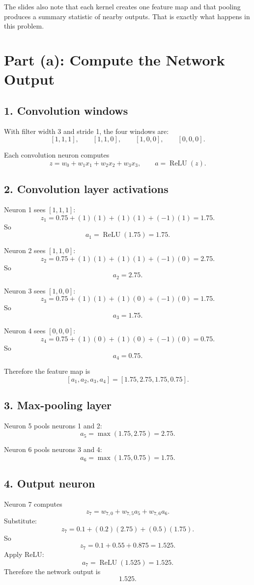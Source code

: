\documentclass[11pt]{article}
\begin{document}
The slides also note that each kernel creates one feature map and that pooling produces a summary statistic of nearby outputs. That is exactly what happens in this problem.

\section*{Part (a): Compute the Network Output}

\subsection*{1. Convolution windows}

With filter width 3 and stride 1, the four windows are:
\[
[1,1,1],\qquad [1,1,0],\qquad [1,0,0],\qquad [0,0,0].
\]

Each convolution neuron computes
\[
z=w_0+w_1x_1+w_2x_2+w_3x_3,
\qquad
a=\operatorname{ReLU}(z).
\]

\subsection*{2. Convolution layer activations}

Neuron 1 sees $[1,1,1]$:
\[
z_1=0.75+(1)(1)+(1)(1)+(-1)(1)=1.75.
\]
So
\[
a_1=\operatorname{ReLU}(1.75)=1.75.
\]

Neuron 2 sees $[1,1,0]$:
\[
z_2=0.75+(1)(1)+(1)(1)+(-1)(0)=2.75.
\]
So
\[
a_2=2.75.
\]

Neuron 3 sees $[1,0,0]$:
\[
z_3=0.75+(1)(1)+(1)(0)+(-1)(0)=1.75.
\]
So
\[
a_3=1.75.
\]

Neuron 4 sees $[0,0,0]$:
\[
z_4=0.75+(1)(0)+(1)(0)+(-1)(0)=0.75.
\]
So
\[
a_4=0.75.
\]

Therefore the feature map is
\[
[a_1,a_2,a_3,a_4]=[1.75,2.75,1.75,0.75].
\]

\subsection*{3. Max-pooling layer}

Neuron 5 pools neurons 1 and 2:
\[
a_5=\max(1.75,2.75)=2.75.
\]

Neuron 6 pools neurons 3 and 4:
\[
a_6=\max(1.75,0.75)=1.75.
\]

\subsection*{4. Output neuron}

Neuron 7 computes
\[
z_7=w_{7,0}+w_{7,5}a_5+w_{7,6}a_6.
\]
Substitute:
\[
z_7=0.1+(0.2)(2.75)+(0.5)(1.75).
\]
So
\[
z_7=0.1+0.55+0.875=1.525.
\]
Apply ReLU:
\[
a_7=\operatorname{ReLU}(1.525)=1.525.
\]
Therefore the network output is
\[
\boxed{1.525.}
\]
\end{document}
